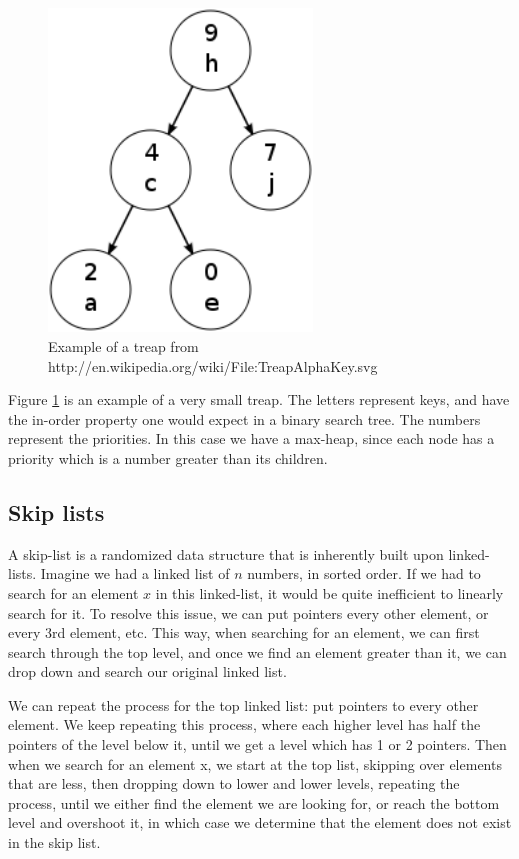 \documentclass[oribibl]{llncs}
\begin{document}
\begin{figure}[here]
\center
\includegraphics[width=7cm]{images/treap}
\caption{Example of a treap from http://en.wikipedia.org/wiki/File:TreapAlphaKey.svg}
\label{fig:treap}
\end{figure}

Figure \ref{fig:treap} is an example of a very small treap. The letters represent keys, and have the in-order property one would expect in a binary search tree. The numbers represent the priorities. In this case we have a max-heap, since each node has a priority which is a number greater than its children.

\subsection{Skip lists}
A skip-list \cite{skip_list} is a randomized data structure that is inherently built upon linked-lists. Imagine we had a linked list of $n$ numbers, in sorted order. If we had to search for an element $x$ in this linked-list, it would be quite inefficient to linearly search for it. To resolve this issue, we can put pointers every other element, or every 3rd element, etc. This way, when searching for an element, we can first search through the top level, and once we find an element greater than it, we can drop down and search our original linked list.

We can repeat the process for the top linked list: put pointers to every other element. We keep repeating this process, where each higher level has half the pointers of the level below it, until we get a level which has 1 or 2 pointers. Then when we search for an element x, we start at the top list, skipping over elements that are less, then dropping down to lower and lower levels, repeating the process, until we either find the element we are looking for, or reach the bottom level and overshoot it, in which case we determine that the element does not exist in the skip list.
\end{document}
